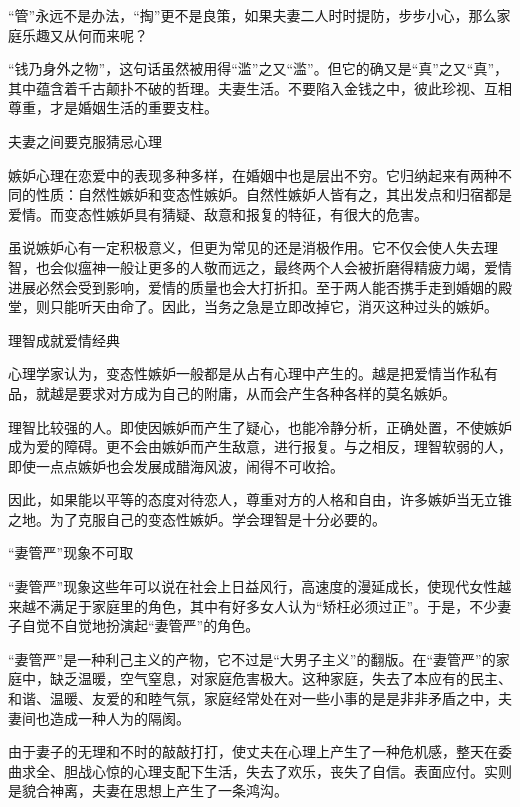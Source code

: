 \documentclass[12pt,UTF8,openany]{ctexbook}
\begin{document}
“管”永远不是办法，“掏”更不是良策，如果夫妻二人时时提防，步步小心，那么家庭乐趣又从何而来呢？

“钱乃身外之物”，这句话虽然被用得“滥”之又“滥”。但它的确又是“真”之又“真”，其中蕴含着千古颠扑不破的哲理。夫妻生活。不要陷入金钱之中，彼此珍视、互相尊重，才是婚姻生活的重要支柱。





夫妻之间要克服猜忌心理


嫉妒心理在恋爱中的表现多种多样，在婚姻中也是层出不穷。它归纳起来有两种不同的性质：自然性嫉妒和变态性嫉妒。自然性嫉妒人皆有之，其出发点和归宿都是爱情。而变态性嫉妒具有猜疑、敌意和报复的特征，有很大的危害。

虽说嫉妒心有一定积极意义，但更为常见的还是消极作用。它不仅会使人失去理智，也会似瘟神一般让更多的人敬而远之，最终两个人会被折磨得精疲力竭，爱情进展必然会受到影响，爱情的质量也会大打折扣。至于两人能否携手走到婚姻的殿堂，则只能听天由命了。因此，当务之急是立即改掉它，消灭这种过头的嫉妒。





理智成就爱情经典


心理学家认为，变态性嫉妒一般都是从占有心理中产生的。越是把爱情当作私有品，就越是要求对方成为自己的附庸，从而会产生各种各样的莫名嫉妒。

理智比较强的人。即使因嫉妒而产生了疑心，也能冷静分析，正确处置，不使嫉妒成为爱的障碍。更不会由嫉妒而产生敌意，进行报复。与之相反，理智软弱的人，即使一点点嫉妒也会发展成醋海风波，闹得不可收拾。

因此，如果能以平等的态度对待恋人，尊重对方的人格和自由，许多嫉妒当无立锥之地。为了克服自己的变态性嫉妒。学会理智是十分必要的。





“妻管严”现象不可取


“妻管严”现象这些年可以说在社会上日益风行，高速度的漫延成长，使现代女性越来越不满足于家庭里的角色，其中有好多女人认为“矫枉必须过正”。于是，不少妻子自觉不自觉地扮演起“妻管严”的角色。

“妻管严”是一种利己主义的产物，它不过是“大男子主义”的翻版。在“妻管严”的家庭中，缺乏温暖，空气窒息，对家庭危害极大。这种家庭，失去了本应有的民主、和谐、温暖、友爱的和睦气氛，家庭经常处在对一些小事的是是非非矛盾之中，夫妻间也造成一种人为的隔阂。

由于妻子的无理和不时的敲敲打打，使丈夫在心理上产生了一种危机感，整天在委曲求全、胆战心惊的心理支配下生活，失去了欢乐，丧失了自信。表面应付。实则是貌合神离，夫妻在思想上产生了一条鸿沟。
\end{document}

